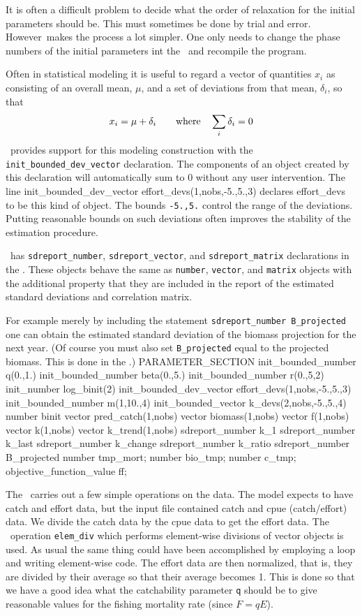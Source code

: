 \documentclass[12pt]{book}
\begin{document}
It is often a difficult problem to decide what the order of
relaxation for the initial parameters should be. This must
sometimes be done by trial and error. However\ADM\
 makes the process a lot simpler. One only needs to
change the phase numbers of the initial parameters
int the \PS\ and recompile the program.

Often in statistical modeling it is useful to regard a vector
of quantities {$x_i$} as consisting of an overall mean, $\mu$,
and a set of deviations from that mean, $\delta_i$, so that
$$x_i=\mu+\delta_i \qquad\hbox{\rm where}\quad\sum_i \delta_i=0 $$ 
\ADM\ provides support for this modeling construction with
the\break 
 {\tt init\_bounded\_dev\_vector} declaration. The components of
an object created by this declaration will automatically sum to 0
without any user intervention. 
The line 
\beginexample
  init_bounded_dev_vector effort_devs(1,nobs,-5.,5.,3)
\endexample
\noindent declares  effort\_devs to be this kind of object.
The bounds {\tt -5.,5.}
control the range of the deviations. Putting reasonable bounds
on such deviations often improves the stability of the
estimation procedure.

\ADM\ has {\tt sdreport\_number}, {\tt sdreport\_vector},
and {\tt sdreport\_matrix} declarations in the \PS.
 These objects behave the same as 
{\tt number}, {\tt vector}, and {\tt matrix} objects
with the additional property that they
are included in the report of the estimated standard
deviations and correlation matrix.

For example merely by including the
statement {\tt sdreport\_number B\_projected}
one can obtain the estimated standard deviation of
the biomass projection for the next year. 
(Of course you must also set {\tt B\_projected}
equal to the projected biomass. This is done in the \PROS.)
\beginexample
PARAMETER_SECTION
  init_bounded_number q(0.,1.)
  init_bounded_number beta(0.,5.)
  init_bounded_number r(0.,5,2)
  init_number log_binit(2)
  init_bounded_dev_vector effort_devs(1,nobs,-5.,5.,3)
  init_bounded_number m(1,10.,4)
  init_bounded_vector k_devs(2,nobs,-5.,5.,4)
  number binit
  vector pred_catch(1,nobs)
  vector biomass(1,nobs)
  vector f(1,nobs)
  vector k(1,nobs)
  vector k_trend(1,nobs)
  sdreport_number k_1
  sdreport_number k_last
  sdreport_number k_change
  sdreport_number k_ratio
  sdreport_number B_projected
  number tmp_mort;
  number bio_tmp;
  number c_tmp;
  objective_function_value ff;
\endexample

The \PCS\ carries out a few simple operations on the data.
The model expects to have catch and effort data, but the input
file contained catch and cpue (catch/effort) data.
We divide the catch data by the cpue data to get the effort
data. The \AD\ operation {\tt elem\_div} which performs
element-wise divisions of vector objects is used.
As usual the same thing could have been accomplished
by employing a loop and writing element-wise code. 
The effort data are then normalized, that is, they are divided by
their average so that their average becomes 1. This is done so that
we have a good idea what the catchability parameter {\tt q}
should be to give reasonable values for the fishing mortality
rate (since $F=qE$). 
\end{document}
